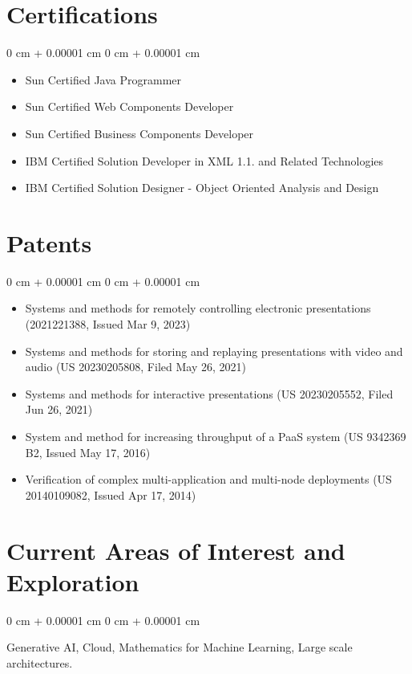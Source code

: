 \documentclass[10pt, letterpaper]{article}
\newenvironment{highlights}{
    \begin{itemize}[
        topsep=0.10 cm,
        parsep=0.10 cm,
        partopsep=0pt,
        itemsep=0pt,
        leftmargin=0 cm + 10pt
    ]
}{
    \end{itemize}
} %
\newenvironment{onecolentry}{
    \begin{adjustwidth}{
        0 cm + 0.00001 cm
    }{
        0 cm + 0.00001 cm
    }
}{
    \end{adjustwidth}
} %
\begin{document}
        \section{Certifications}
        \vspace{0.10 cm}
        \begin{onecolentry}
            \begin{highlights}
                \item Sun Certified Java Programmer
                \item Sun Certified Web Components Developer
                \item Sun Certified Business Components Developer
                \item IBM Certified Solution Developer in XML 1.1. and Related Technologies
                \item IBM Certified Solution Designer - Object Oriented Analysis and Design
            \end{highlights}
        \end{onecolentry}

        \section{Patents}
        \vspace{0.10 cm}
        \begin{onecolentry}
            \begin{highlights}
                \item Systems and methods for remotely controlling electronic presentations (2021221388, Issued Mar 9, 2023)
                \item Systems and methods for storing and replaying presentations with video and audio (US 20230205808, Filed May 26, 2021)
                \item Systems and methods for interactive presentations (US 20230205552, Filed Jun 26, 2021)
                \item System and method for increasing throughput of a PaaS system (US 9342369 B2, Issued May 17, 2016)
                \item Verification of complex multi-application and multi-node deployments (US 20140109082, Issued Apr 17, 2014)
            \end{highlights}
        \end{onecolentry}
        
        \section{Current Areas of Interest and Exploration}
        \vspace{0.10 cm}
        \begin{onecolentry}
            Generative AI, Cloud, Mathematics for Machine Learning, Large scale architectures.
        \end{onecolentry}
\end{document}
